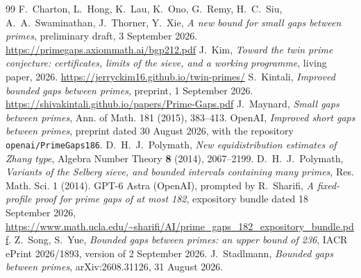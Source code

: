 \documentclass[11pt]{amsart}
\theoremstyle{definition}
\theoremstyle{remark}
\begin{document}
\begin{thebibliography}{99}
 F.~Charton, L.~Hong, K.~Lau, K.~Ono, G.~Remy, H.~C.~Siu,
A.~A.~Swaminathan, J.~Thorner, Y.~Xie, \emph{A new bound for small gaps
between primes}, preliminary draft, 3 September 2026.
\url{https://primegaps.axiommath.ai/bgp212.pdf}
 J.~Kim, \emph{Toward the twin prime conjecture: certificates,
limits of the sieve, and a working programme}, living paper, 2026.
\url{https://jerryckim16.github.io/twin-primes/}
 S.~Kintali, \emph{Improved bounded gaps between primes},
preprint, 1 September 2026.
\url{https://shivakintali.github.io/papers/Prime-Gaps.pdf}
 J.~Maynard, \emph{Small gaps between primes}, Ann. of Math.
181 (2015), 383--413.
 OpenAI, \emph{Improved short gaps between primes}, preprint
dated 30 August 2026, with the repository \texttt{openai/PrimeGaps186}.
 D.~H.~J.~Polymath, \emph{New equidistribution estimates of Zhang type}, Algebra Number Theory \textbf{8} (2014), 2067--2199.
 D.~H.~J.~Polymath, \emph{Variants of the Selberg sieve, and
bounded intervals containing many primes}, Res. Math. Sci. 1 (2014).
 GPT-6 Astra (OpenAI), prompted by R.~Sharifi, \emph{A
fixed-profile proof for prime gaps of at most 182}, expository bundle dated
18 September 2026, \url{https://www.math.ucla.edu/~sharifi/AI/prime_gaps_182_expository_bundle.pdf}.
 Z.~Song, S.~Yue, \emph{Bounded gaps between primes: an upper
bound of 236}, IACR ePrint 2026/1893, version of 2 September 2026.
 J.~Stadlmann, \emph{Bounded gaps between primes},
arXiv:2608.31126, 31 August 2026.
\end{thebibliography}
\end{document}
